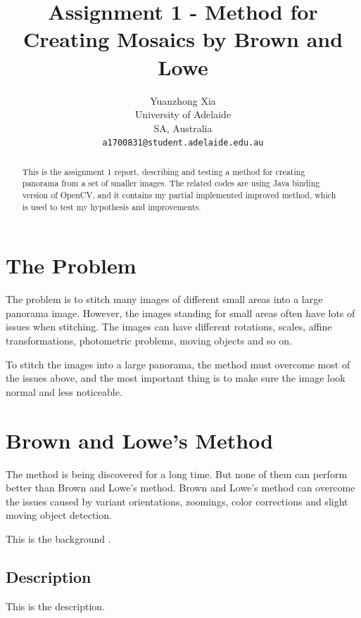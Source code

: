 \documentclass[10pt,twocolumn,letterpaper]{article}
\begin{document}
\title{Assignment 1 - Method for Creating Mosaics by Brown and Lowe}
\author{Yuanzhong Xia\\
University of Adelaide\\
SA, Australia\\
{\tt\small a1700831@student.adelaide.edu.au}
}
\maketitle

\begin{abstract}
This is the assignment 1 report, describing and testing a method for creating panorama from a set of smaller images.
The related codes are using Java binding version of OpenCV, and it contains my partial implemented improved method, which is used to test my hypothesis and improvements.
\end{abstract}


\section{The Problem}
The problem is to stitch many images of different small areas into a large panorama image.
However, the images standing for small areas often have lots of issues when stitching.
The images can have different rotations, scales, affine transformations, photometric problems, moving objects and so on.

To stitch the images into a large panorama, the method must overcome most of the issues above,
and the most important thing is to make sure the image look normal and less noticeable.


\section{Brown and Lowe's Method}
The method is being discovered for a long time. But none of them can perform better than Brown and Lowe's method.
Brown and Lowe's method can overcome the issues caused by variant orientations, zoomings, color corrections and slight moving object detection.


This is the background \cite{origin}.

\subsection{Description}
This is the description.
\end{document}
